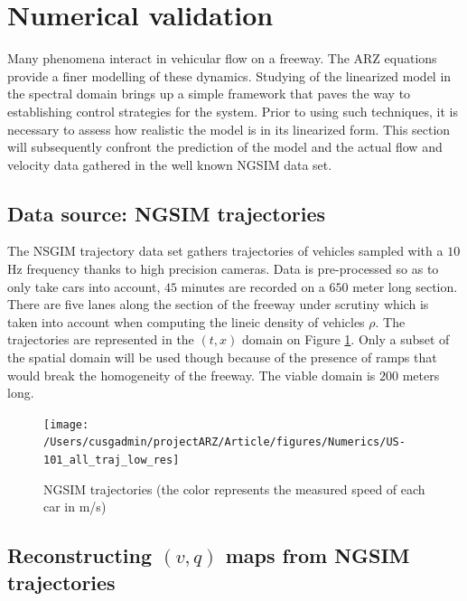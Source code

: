 \documentclass[preprint]{elsarticle}
\begin{document}
\section{Numerical validation}

Many phenomena interact in vehicular flow on a freeway. The ARZ equations
provide a finer modelling of these dynamics. Studying of the linearized
model in the spectral domain brings up a simple framework that paves
the way to establishing control strategies for the system. Prior to
using such techniques, it is necessary to assess how realistic the
model is in its linearized form. This section will subsequently confront the prediction of the model and the actual flow
and velocity data gathered in the well known NGSIM data set.


\subsection{Data source: NGSIM trajectories}

The NSGIM trajectory data set gathers trajectories of vehicles sampled
with a $10$ Hz frequency thanks to high precision cameras. Data is pre-processed so as to only take cars into account, $45$ minutes are recorded on a $650$ meter long section. There are
five lanes along the section of the freeway under scrutiny which is
taken into account when computing the lineic density of vehicles $\rho$\@.
The trajectories are represented in the $\left(t,x\right)$ domain
on Figure \ref{fig:NGSIM-trajectories}.
Only a subset of the spatial domain will be used though because of the presence of ramps that would break the homogeneity of the freeway. The viable domain is $200$ meters long.

\begin{figure}
\begin{centering}
\texttt{[image: /Users/cusgadmin/projectARZ/Article/figures/Numerics/US-101\_all\_traj\_low\_res]}
\par\end{centering}

\protect\caption{NGSIM trajectories (the color represents the measured speed of each
car in m/s)\label{fig:NGSIM-trajectories}}
\end{figure}



\subsection{Reconstructing $\left(v,q\right)$ maps from NGSIM trajectories}
\end{document}

